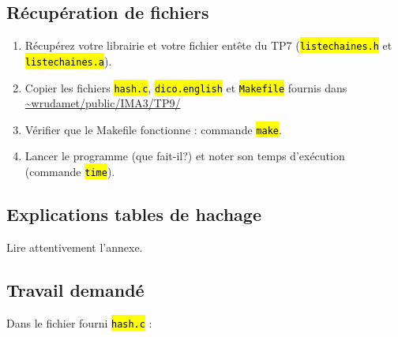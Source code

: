 \documentclass[final, pdftex, a4paper, openbib, ]{article}
\let\OldTexttt\texttt
\renewcommand{\texttt}[1]{\OldTexttt{\hl{#1}}}
\begin{document}
\subsection{Récupération de fichiers}

\begin{enumerate}
	\item Récupérez votre librairie et votre fichier entête du TP7 (\texttt{listechaines.h} et \texttt{listechaines.a}).
	\item Copier les fichiers \texttt{hash.c}, \texttt{dico.english} et \texttt{Makefile} fournis dans \url{~wrudamet/public/IMA3/TP9/}
	\item Vérifier que le Makefile fonctionne : commande \texttt{make}.
	\item Lancer le programme (que fait-il?) et noter son temps d'exécution (commande \texttt{time}).
\end{enumerate}	


\subsection{Explications tables de hachage}
Lire attentivement l'annexe.


\subsection{Travail demandé}
	Dans le fichier fourni \texttt{hash.c} :
\end{document}

